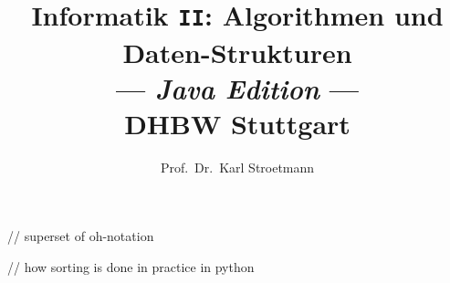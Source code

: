 \documentclass{report}
\title{Informatik \texttt{II}: Algorithmen und Daten-Strukturen \\[0.3cm]
      --- \textsl{Java Edition} --- \\[0.3cm]
      DHBW Stuttgart}
\author{Prof.~Dr.~Karl Stroetmann}
\theoremstyle{plain}
\begin{document}
\maketitle
\tableofcontents


 // superset of oh-notation
%



  // how sorting is done in practice in python










\end{document}
